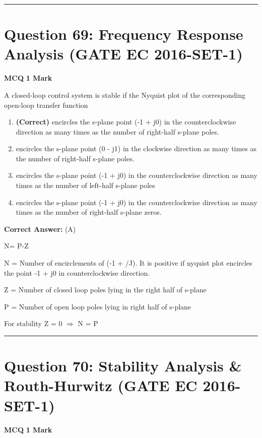 \documentclass[11pt,a4paper]{article}
\begin{document}
\vspace{1.5em}
\hrule
\vspace{1.5em}

\section*{Question 69: Frequency Response Analysis (GATE EC 2016-SET-1)}
\noindent \textbf{\color{primary}MCQ} \hfill \textbf{\color{secondary}1 Mark}


\noindent A closed-loop control system is stable if the Nyquist plot of the corresponding open-loop transfer function


\begin{enumerate}[label=(\Alph*)]
    \item \textbf{(Correct)} encircles the s-plane point (-1 + j0) in the counterclockwise direction as many times as the number of right-half s-plane poles.
    \item encircles the s-plane point (0 - j1) in the clockwise direction as many times as the number of right-half s-plane poles.
    \item encircles the s-plane point (-1 + j0) in the counterclockwise direction as many times as the number of left-half s-plane poles
    \item encircles the s-plane point (-1 + j0) in the counterclockwise direction as many times as the number of right-half s-plane zeros.
\end{enumerate}

\noindent \textbf{Correct Answer:} (A)

\begin{tcolorbox}[solbox, title=Detailed Solution -- Question 69]
N= P-Z

N = Number of encirclements of (-1 + /J). It is
positive if nyquist plot encircles the point -1 + j0
in counterclockwise direction.

Z = Number of closed loop poles lying in the right
half of s-plane

P = Number of open loop poles lying in right half
of s-plane

For stability Z = 0 $\Rightarrow$ N = P
\end{tcolorbox}

\vspace{1.5em}
\hrule
\vspace{1.5em}

\section*{Question 70: Stability Analysis \& Routh-Hurwitz (GATE EC 2016-SET-1)}
\noindent \textbf{\color{primary}MCQ} \hfill \textbf{\color{secondary}1 Mark}
\end{document}

